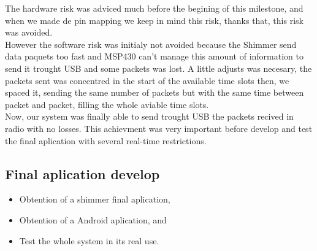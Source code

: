 		The hardware risk was adviced much before the begining of this milestone, and when we made de pin mapping we keep in mind this risk, thanks that, this risk was avoided.\\

		However the software risk was initialy not avoided because the Shimmer send data paquets too fast and MSP430 can't manage this amount of information to send it trought USB and some packets was lost. A little adjusts was necesary, the packets sent was concentred in the start of the available time slots then, we spaced it, sending the same number of packets but with the same time between packet and packet, filling the whole aviable time slots. \\

		Now, our system was finally able to send trought USB the packets recived in radio with no losses. This achievment was very important before develop and test the final aplication with several real-time restrictions.\\

		\subsection{Final aplication develop}
		\begin{itemize}
		\item Obtention of a shimmer final aplication,
		\item Obtention of a Android aplication, and
		\item Test the whole system in its real use.
		\end{itemize}
		
	

